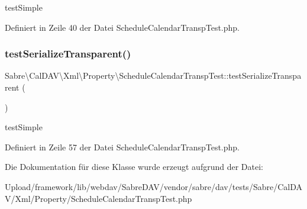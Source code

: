 test\+Simple 

Definiert in Zeile 40 der Datei Schedule\+Calendar\+Transp\+Test.\+php.

\mbox{\label{class_sabre_1_1_cal_d_a_v_1_1_xml_1_1_property_1_1_schedule_calendar_transp_test_a1e49996d97d4aa63532ee68ea88581a5}} 
\subsubsection{\texorpdfstring{test\+Serialize\+Transparent()}{testSerializeTransparent()}}
{\footnotesize\ttfamily Sabre\textbackslash{}\+Cal\+D\+A\+V\textbackslash{}\+Xml\textbackslash{}\+Property\textbackslash{}\+Schedule\+Calendar\+Transp\+Test\+::test\+Serialize\+Transparent (\begin{DoxyParamCaption}{ }\end{DoxyParamCaption})}

test\+Simple 

Definiert in Zeile 57 der Datei Schedule\+Calendar\+Transp\+Test.\+php.



Die Dokumentation für diese Klasse wurde erzeugt aufgrund der Datei\+:\begin{DoxyCompactItemize}
\item 
Upload/framework/lib/webdav/\+Sabre\+D\+A\+V/vendor/sabre/dav/tests/\+Sabre/\+Cal\+D\+A\+V/\+Xml/\+Property/Schedule\+Calendar\+Transp\+Test.\+php\end{DoxyCompactItemize}
